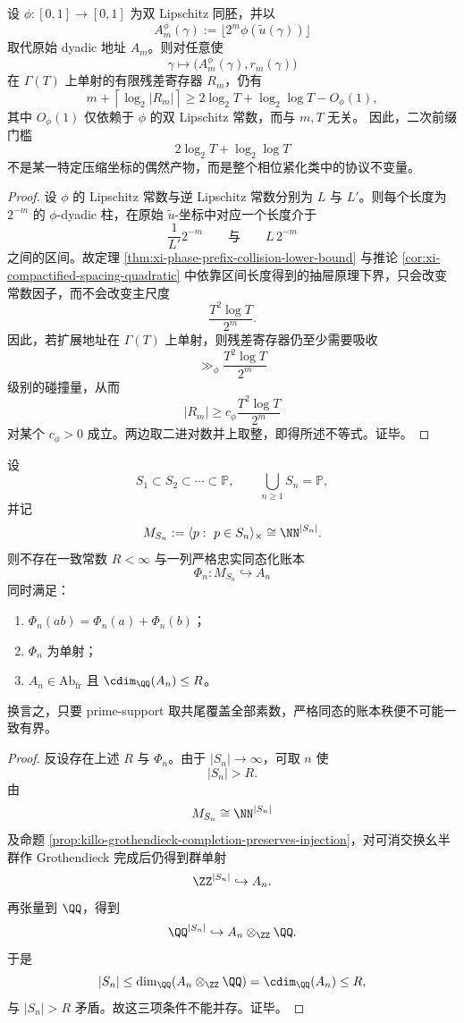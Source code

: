 \begin{proposition}\label{prop:conclusion-quadratic-prefix-threshold-bilipschitz-invariance}
设 \(\phi:[0,1]\to[0,1]\) 为双 Lipschitz 同胚，并以
\[
A_m^\phi(\gamma):=\bigl\lfloor 2^m\phi(\widetilde u(\gamma))\bigr\rfloor
\]
取代原始 dyadic 地址 \(A_m\)。则对任意使
\[
\gamma\longmapsto \bigl(A_m^\phi(\gamma),r_m(\gamma)\bigr)
\]
在 \(\Gamma(T)\) 上单射的有限残差寄存器 \(R_m\)，仍有
\[
m+\left\lceil \log_2|R_m|\right\rceil
\ge
2\log_2 T+\log_2\log T-O_\phi(1),
\]
其中 \(O_\phi(1)\) 仅依赖于 \(\phi\) 的双 Lipschitz 常数，而与 \(m,T\) 无关。
因此，二次前缀门槛
\[
2\log_2 T+\log_2\log T
\]
不是某一特定压缩坐标的偶然产物，而是整个相位紧化类中的协议不变量。
\end{proposition}
\begin{proof}
设 \(\phi\) 的 Lipschitz 常数与逆 Lipschitz 常数分别为 \(L\) 与 \(L'\)。则每个长度为 \(2^{-m}\) 的 \(\phi\)-dyadic 柱，在原始 \(\widetilde u\)-坐标中对应一个长度介于
\[
\frac{1}{L'}2^{-m}
\qquad\text{与}\qquad
L\,2^{-m}
\]
之间的区间。故定理 \ref{thm:xi-phase-prefix-collision-lower-bound} 与推论 \ref{cor:xi-compactified-spacing-quadratic} 中依靠区间长度得到的抽屉原理下界，只会改变常数因子，而不会改变主尺度
\[
\frac{T^2\log T}{2^m}.
\]
因此，若扩展地址在 \(\Gamma(T)\) 上单射，则残差寄存器仍至少需要吸收
\[
\gg_\phi \frac{T^2\log T}{2^m}
\]
级别的碰撞量，从而
\[
|R_m|\ge c_\phi\frac{T^2\log T}{2^m}
\]
对某个 \(c_\phi>0\) 成立。两边取二进对数并上取整，即得所述不等式。证毕。
\end{proof}

\begin{theorem}[共尾素数支撑与一致有界秩严格账本不相容]\label{thm:conclusion-cofinal-prime-support-no-uniform-bounded-rank-ledger}
设
\[
S_1\subset S_2\subset\cdots\subset \mathbb P,
\qquad
\bigcup_{n\ge 1}S_n=\mathbb P,
\]
并记
\[
M_{S_n}:=\langle p:\ p\in S_n\rangle_\times\cong \NN^{|S_n|}.
\]
则不存在一致常数 \(R<\infty\) 与一列严格忠实同态化账本
\[
\Phi_n:M_{S_n}\hookrightarrow A_n
\]
同时满足：
\begin{enumerate}
  \item \(\Phi_n(ab)=\Phi_n(a)+\Phi_n(b)\)；
  \item \(\Phi_n\) 为单射；
  \item \(A_n\in \mathrm{Ab}_{\mathrm{fr}}\) 且 \(\cdim_{\QQ}(A_n)\le R\)。
\end{enumerate}
换言之，只要 prime-support 取共尾覆盖全部素数，严格同态的账本秩便不可能一致有界。
\end{theorem}
\begin{proof}
反设存在上述 \(R\) 与 \(\Phi_n\)。由于 \(|S_n|\to\infty\)，可取 \(n\) 使
\[
|S_n|>R.
\]
由
\[
M_{S_n}\cong \NN^{|S_n|}
\]
及命题 \ref{prop:killo-grothendieck-completion-preserves-injection}，对可消交换幺半群作 Grothendieck 完成后仍得到群单射
\[
\ZZ^{|S_n|}\hookrightarrow A_n.
\]
再张量到 \(\QQ\)，得到
\[
\QQ^{|S_n|}\hookrightarrow A_n\otimes_{\ZZ}\QQ.
\]
于是
\[
|S_n|
\le
\dim_{\QQ}(A_n\otimes_{\ZZ}\QQ)
=
\cdim_{\QQ}(A_n)
\le
R,
\]
与 \(|S_n|>R\) 矛盾。故这三项条件不能并存。证毕。
\end{proof}

